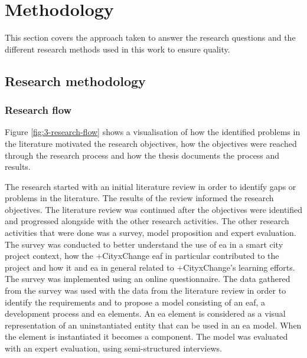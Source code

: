 \chapter{Methodology}
\label{chap:methodology}

This section covers the approach taken to answer the research questions and the different research methods used in this work to ensure quality.
\section{Research methodology}
\subsection{Research flow}

Figure \ref{fig:3-research-flow} shows a visualisation of how the identified problems in the literature motivated the research objectives, how the objectives were reached through the research process and how the thesis documents the process and results.

The research started with an initial literature review in order to identify gaps or problems in the literature. The results of the review informed the research objectives. 
The literature review was continued after the objectives were identified and progressed alongside with the other research activities. The other research activities that were done was a survey, model proposition and expert evaluation. The survey was conducted to better understand the use of \gls{ea} in a smart city project context, how the +CityxChange \gls{eaf} in particular contributed to the project and how it and \gls{ea} in general related to +CityxChange's learning efforts.
The survey was implemented using an online questionnaire.
The data gathered from the survey was used with the data from the literature review in order to identify the requirements and to propose a model consisting of an \gls{eaf}, a development process and \gls{ea} elements. An \gls{ea} element is considered as a visual representation of an uninstantiated entity that can be used in an \gls{ea} model. When the element is instantiated it becomes a component. 
The model was evaluated with an expert evaluation, using semi-structured interviews. 

